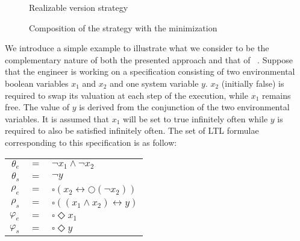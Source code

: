 \begin{figure}[bt]
	\centering
	\SmallPicture
	\caption{Realizable version strategy}
	\label{fig:konig_strategy_2}
	\MediumPicture
\end{figure}
\begin{figure}[bt]
	\centering
	\SmallPicture
	\caption{Composition of the strategy with the minimization}
	\label{fig:konig_composition_2}
	\MediumPicture
\end{figure}
\clearpage


We introduce a simple example to illustrate what we consider to be the complementary nature 
of both the presented approach and that of ~\cite{DBLP:conf/hvc/KonighoferHB10}. Suppose that the engineer is working on a specification consisting of two environmental boolean variables $x_1$ and $x_2$ and one system variable $y$. $x_2$ (initially false) is required to swap its valuation at each step of the execution, while $x_1$ remains free. The value of $y$ is derived from the conjunction of the two environmental variables.
It is assumed that $x_1$ will be set to true infinitely often while $y$ is required to also be satisfied infinitely often. The set of LTL formulae corresponding to this specification is as follow: 
\begin{center}
	\begin{tabular}{ r c l }
	$\theta_e$& $=$ &$\neg x_1 \wedge \neg x_2$\\
	$\theta_s$& $=$ &$\neg y$\\
	$\rho_e$& $=$ &$\square(x_2 \leftrightarrow \bigcirc(\neg x_2))$\\
	$\rho_s$& $=$ &$\square((x_1 \wedge x_2) \leftrightarrow y)$\\
	$\varphi_e$& $=$ &$\square \Diamond x_1$\\
	$\varphi_s$& $=$ &$\square \Diamond y$\\
\end{tabular}
\end{center}

